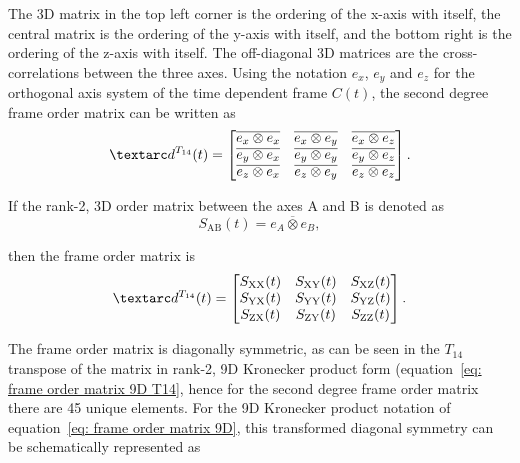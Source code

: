 The 3D matrix in the top left corner is the ordering of the x-axis with itself, the central matrix is the ordering of the y-axis with itself, and the bottom right is the ordering of the z-axis with itself.
The off-diagonal 3D matrices are the cross-correlations between the three axes.
Using the notation $e_x$, $e_y$ and $e_z$ for the orthogonal axis system of the time dependent frame $C(t)$, the second degree frame order matrix can be written as
\begin{equation}    %
    \FO^{T_{14}}(t) =
        \begin{bmatrix}
            \overline{e_x \otimes e_x} & \overline{e_x \otimes e_y} & \overline{e_x \otimes e_z} \\
            \overline{e_y \otimes e_x} & \overline{e_y \otimes e_y} & \overline{e_y \otimes e_z} \\
            \overline{e_z \otimes e_x} & \overline{e_z \otimes e_y} & \overline{e_z \otimes e_z}
        \end{bmatrix} .
\end{equation}

If the rank-2, 3D order matrix between the axes A and B is denoted as
\begin{equation}    %
    S_\textrm{AB}(t) = \overline{e_A \otimes e_B},
\end{equation}

then the frame order matrix is
\begin{equation}    %
    \FO^{T_{14}}(t) =
        \begin{bmatrix}
            S_\textrm{XX}(t) & S_\textrm{XY}(t) & S_\textrm{XZ}(t) \\
            S_\textrm{YX}(t) & S_\textrm{YY}(t) & S_\textrm{YZ}(t) \\
            S_\textrm{ZX}(t) & S_\textrm{ZY}(t) & S_\textrm{ZZ}(t)
        \end{bmatrix} .
\end{equation}


The frame order matrix is diagonally symmetric, as can be seen in the $T_{14}$ transpose of the matrix in rank-2, 9D Kronecker product form (equation~\ref{eq: frame order matrix 9D T14}, hence for the second degree frame order matrix there are 45 unique elements.
For the 9D Kronecker product notation of equation~\ref{eq: frame order matrix 9D}, this transformed diagonal symmetry can be schematically represented as

